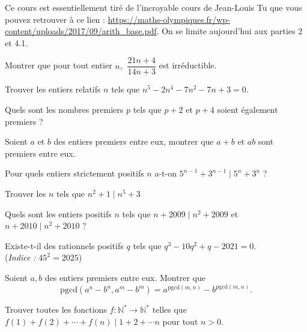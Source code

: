 Ce cours est essentiellement tiré de l'incroyable cours de Jean-Louis Tu que vous pouvez retrouver à ce lien : \url{https://maths-olympiques.fr/wp-content/uploads/2017/09/arith_base.pdf}. On se limite aujourd'hui aux parties 2 et 4.1.\newline\newline




\begin{exo}
Montrer que pour tout entier $n$, $\:\dfrac{21n+4}{14n+3}$ est irréductible.
\end{exo}
\begin{exo}
Trouver les entiers relatifs $n$ tels que $n^5-2n^4-7n^2-7n+3=0$.
\end{exo}
\begin{exo}
Quels sont les nombres premiers $p$ tels que $p+2$ et $p+4$ soient également premiers ?
\end{exo}
\begin{exo}
Soient $a$ et $b$ des entiers premiers entre eux, montrer que $a+b$ et $ab$ sont premiers entre eux.
\end{exo}
\begin{exo}
Pour quels entiers strictement positifs $n$ a-t-on $5^{n-1}+3^{n-1}\mid 5^n+3^n$ ?
\end{exo}
\begin{exo}
Trouver les $n$ tels que $n^2+1\mid n^5+3$
\end{exo}
\begin{exo}
Quels sont les entiers positifs $n$ tels que $n+2009\mid n^2+2009$ et $n+2010\mid n^2+2010$ ?
\end{exo}
\begin{exo}
Existe-t-il des rationnels positifs $q$ tels que $q^3-10q^2+q-2021=0.$ \\(\emph{Indice :} $45^2=2025$)
\end{exo}
\begin{exo}
Soient $a,b$ des entiers premiers entre eux. 
Montrer que $$\mathrm{pgcd}(a^n-b^n,a^m-b^m)=a^{\mathrm{pgcd}(m,n)}-b^{\mathrm{pgcd}(m,n)}.$$
\end{exo}
\begin{exo}
Trouver toutes les fonctions $f:\mathbb N^*\rightarrow\mathbb N^*$ telles que $f(1)+f(2)+\cdots+f(n)\mid 1+2+\cdots n$ pour tout $n>0.$
\end{exo}

